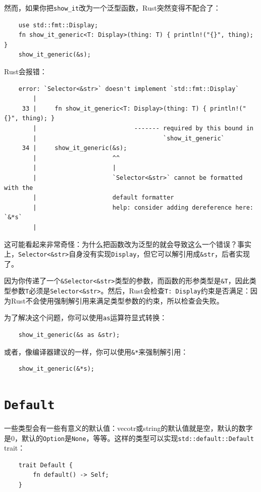 然而，如果你把\texttt{show\_it}改为一个泛型函数，Rust突然变得不配合了：
\begin{verbatim}
    use std::fmt::Display;
    fn show_it_generic<T: Display>(thing: T) { println!("{}", thing); }
    show_it_generic(&s);
\end{verbatim}

Rust会报错：
\begin{verbatim}
    error: `Selector<&str>` doesn't implement `std::fmt::Display`
        |
     33 |     fn show_it_generic<T: Display>(thing: T) { println!("{}", thing); }
        |                           ------- required by this bound in
        |                                   `show_it_generic`
     34 |     show_it_generic(&s);
        |                     ^^
        |                     |
        |                     `Selector<&str>` cannot be formatted with the
        |                     default formatter
        |                     help: consider adding dereference here: `&*s`
        |
\end{verbatim}

这可能看起来非常奇怪：为什么把函数改为泛型的就会导致这么一个错误？事实上，\texttt{Selector<\&str>}自身没有实现\texttt{Display}，但它可以解引用成\texttt{\&str}，后者实现了。

因为你传递了一个\texttt{\&Selector<\&str>}类型的参数，而函数的形参类型是\texttt{\&T}，因此类型参数\texttt{T}必须是\texttt{Selector<\&str>}。然后，Rust会检查\texttt{T: Display}约束是否满足：因为Rust不会使用强制解引用来满足类型参数的约束，所以检查会失败。

为了解决这个问题，你可以使用\texttt{as}运算符显式转换：
\begin{verbatim}
    show_it_generic(&s as &str);
\end{verbatim}

或者，像编译器建议的一样，你可以使用\texttt{\&*}来强制解引用：
\begin{verbatim}
    show_it_generic(&*s);
\end{verbatim}

\section{\texttt{Default}}\label{default}

一些类型会有一些有意义的默认值：vecotr或string的默认值就是空，默认的数字是0，默认的\texttt{Option}是\texttt{None}，等等。这样的类型可以实现\texttt{std::default::Default} trait：
\begin{verbatim}
    trait Default {
        fn default() -> Self;
    }
\end{verbatim}

